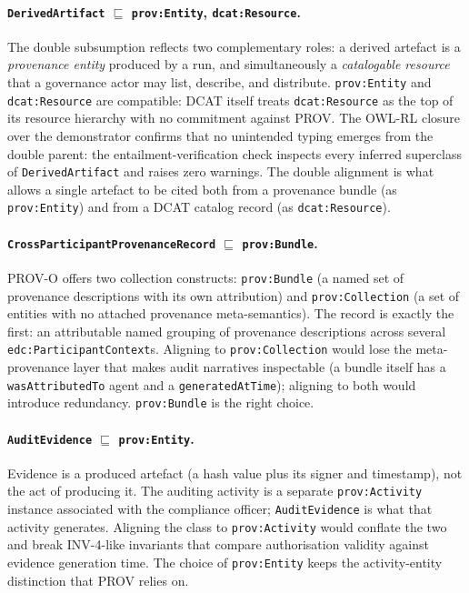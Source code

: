 \documentclass[11pt,a4paper]{article}
\newcommand{\code}[1]{\texttt{#1}}
\begin{document}
\paragraph{\code{DerivedArtifact} $\sqsubseteq$ \code{prov:Entity}, \code{dcat:Resource}.} The double subsumption reflects two complementary roles: a derived artefact is a \emph{provenance entity} produced by a run, and simultaneously a \emph{catalogable resource} that a governance actor may list, describe, and distribute. \code{prov:Entity} and \code{dcat:Resource} are compatible: DCAT itself treats \code{dcat:Resource} as the top of its resource hierarchy with no commitment against PROV. The OWL-RL closure over the demonstrator confirms that no unintended typing emerges from the double parent: the entailment-verification check inspects every inferred superclass of \code{DerivedArtifact} and raises zero warnings. The double alignment is what allows a single artefact to be cited both from a provenance bundle (as \code{prov:Entity}) and from a DCAT catalog record (as \code{dcat:Resource}).

\paragraph{\code{CrossParticipantProvenanceRecord} $\sqsubseteq$ \code{prov:Bundle}.} PROV-O offers two collection constructs: \code{prov:Bundle} (a named set of provenance descriptions with its own attribution) and \code{prov:Collection} (a set of entities with no attached provenance meta-semantics). The record is exactly the first: an attributable named grouping of provenance descriptions across several \code{edc:ParticipantContext}s. Aligning to \code{prov:Collection} would lose the meta-provenance layer that makes audit narratives inspectable (a bundle itself has a \code{wasAttributedTo} agent and a \code{generatedAtTime}); aligning to both would introduce redundancy. \code{prov:Bundle} is the right choice.

\paragraph{\code{AuditEvidence} $\sqsubseteq$ \code{prov:Entity}.} Evidence is a produced artefact (a hash value plus its signer and timestamp), not the act of producing it. The auditing activity is a separate \code{prov:Activity} instance associated with the compliance officer; \code{AuditEvidence} is what that activity generates. Aligning the class to \code{prov:Activity} would conflate the two and break INV-4-like invariants that compare authorisation validity against evidence generation time. The choice of \code{prov:Entity} keeps the activity-entity distinction that PROV relies on.
\end{document}
